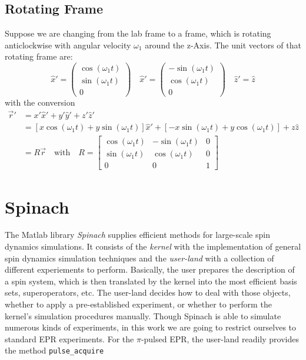 \documentclass[11.5pt,a4paper]{article}
\begin{document}
\subsection{Rotating Frame}
Suppose we are changing from the lab frame to a frame, which is rotating anticlockwise with angular velocity $\omega_1$ around the z-Axis. The unit vectors of that rotating frame are:
\begin{equation}
 \hat{x}' = \begin{pmatrix} \cos(\omega_1 t) \\ \sin(\omega_1 t) \\ 0 \end{pmatrix} \quad
 \hat{x}' = \begin{pmatrix} - \sin(\omega_1 t) \\  \cos(\omega_1 t)\\ 0 \end{pmatrix} \quad
 \hat{z}' = \hat{z}
\end{equation}
with the conversion 
\begin{align}
 \vec{r}' & = x'\hat{x}' + y'\hat{y}' + z'\hat{z}' \\
	  & = \left[x \cos(\omega_1 t)+ y \sin(\omega_1 t) \right] \hat{x}' + \left[- x \sin(\omega_1 t)+ y \cos(\omega_1 t) \right] + z \hat{z} \\
	  & = R \vec{r} \quad \text{with} \quad R = 
	    \begin{bmatrix} 
	      \cos(\omega_1 t)	& -\sin(\omega_1 t) & 0	\\
	      \sin(\omega_1 t)	& \cos(\omega_1 t) & 0 \\
	      0 & 0 & 1
	    \end{bmatrix}
\end{align}





\section{Spinach}
The Matlab library \emph{Spinach} supplies efficient methods for large-scale spin dynamics simulations. It consists of the \emph{kernel} with the implementation of general spin dynamics simulation techniques and the \emph{user-land} with a collection of different experiements to perform. Basically, the user prepares the description of a spin system, which is then translated by the kernel into the most efficient basis sets, superoperators, etc. The user-land decides how to deal with those objects, whether to apply a pre-established experiment, or whether to perform the kernel's simulation procedures manually. Though Spinach is able to simulate numerous kinds of experiments, in this work we are going to restrict ourselves to standard EPR experiments. For the $\pi$-pulsed EPR, the user-land readily provides the method \verb|pulse_acquire|
\end{document}
